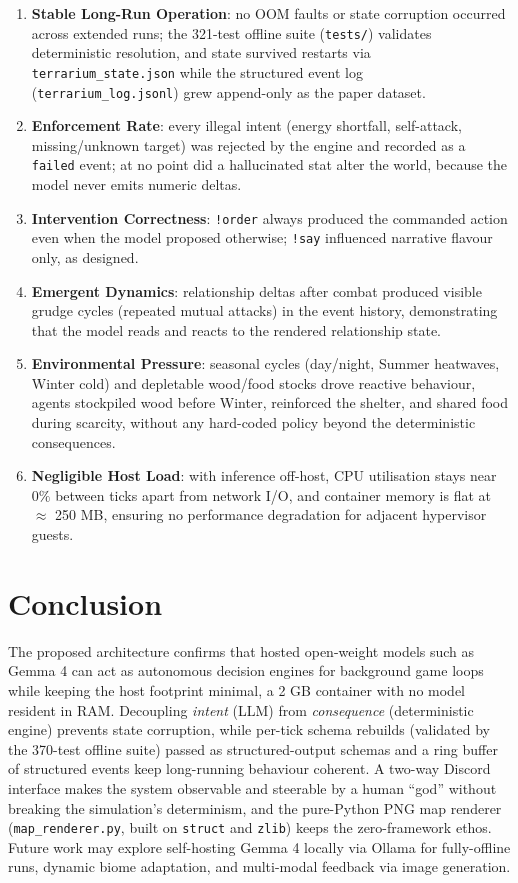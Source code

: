 \documentclass[10pt,a4paper]{article}
\begin{document}
\begin{enumerate}
\item \textbf{Stable Long-Run Operation}: no OOM faults or state corruption occurred across extended runs; the 321-test offline suite (\texttt{tests/}) validates deterministic resolution, and state survived restarts via \texttt{terrarium\_state.json} while the structured event log (\texttt{terrarium\_log.jsonl}) grew append-only as the paper dataset.
\item \textbf{Enforcement Rate}: every illegal intent (energy shortfall, self-attack, missing/unknown target) was rejected by the engine and recorded as a \texttt{failed} event; at no point did a hallucinated stat alter the world, because the model never emits numeric deltas.
\item \textbf{Intervention Correctness}: \texttt{!order} always produced the commanded action even when the model proposed otherwise; \texttt{!say} influenced narrative flavour only, as designed.
\item \textbf{Emergent Dynamics}: relationship deltas after combat produced visible grudge cycles (repeated mutual attacks) in the event history, demonstrating that the model reads and reacts to the rendered relationship state.
\item \textbf{Environmental Pressure}: seasonal cycles (day/night, Summer heatwaves, Winter cold) and depletable wood/food stocks drove reactive behaviour, agents stockpiled wood before Winter, reinforced the shelter, and shared food during scarcity, without any hard-coded policy beyond the deterministic consequences.
\item \textbf{Negligible Host Load}: with inference off-host, CPU utilisation stays near \(0\%\) between ticks apart from network I/O, and container memory is flat at \(\approx\) 250 MB, ensuring no performance degradation for adjacent hypervisor guests.
\end{enumerate}

\section{Conclusion}
The proposed architecture confirms that hosted open-weight models such as Gemma 4 can act as autonomous decision engines for background game loops while keeping the host footprint minimal, a 2 GB container with no model resident in RAM. Decoupling \emph{intent} (LLM) from \emph{consequence} (deterministic engine) prevents state corruption, while per-tick schema rebuilds (validated by the 370-test offline suite) passed as structured-output schemas and a ring buffer of structured events keep long-running behaviour coherent. A two-way Discord interface makes the system observable and steerable by a human ``god'' without breaking the simulation's determinism, and the pure-Python PNG map renderer (\texttt{map\_renderer.py}, built on \texttt{struct} and \texttt{zlib}) keeps the zero-framework ethos. Future work may explore self-hosting Gemma 4 locally via Ollama for fully-offline runs, dynamic biome adaptation, and multi-modal feedback via image generation.
\end{document}

